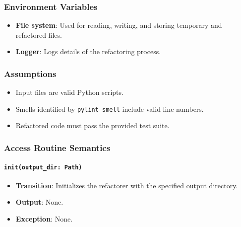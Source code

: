 \documentclass[12pt, titlepage]{article}
\begin{document}
\subsubsection{Environment Variables}

\begin{itemize}
\item \textbf{File system}: Used for reading, writing, and storing temporary and refactored files.
\item \textbf{Logger}: Logs details of the refactoring process.
\end{itemize}

\subsubsection{Assumptions}

\begin{itemize}
  \item Input files are valid Python scripts.
  \item Smells identified by \texttt{pylint\_smell} include valid line numbers.
  \item Refactored code must pass the provided test suite.
\end{itemize}

\subsubsection{Access Routine Semantics}

\paragraph{\texttt{init(output\_dir: Path)}}
\begin{itemize}
\item \textbf{Transition}: Initializes the refactorer with the specified output directory.
\item \textbf{Output}: None.
\item \textbf{Exception}: None.
\end{itemize}
\end{document}

